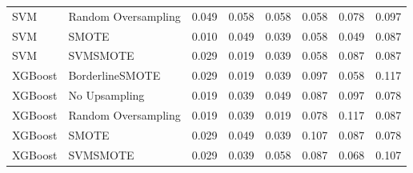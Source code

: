 \begin{tabular}{llllllll}
                         SVM & Random Oversampling & 0.049 &                     0.058 &                 0.058 &                  0.058 &                                   0.078 &    0.097 \\
                         SVM &               SMOTE & 0.010 &                     0.049 &                 0.039 &                  0.058 &                                   0.049 &    0.087 \\
                         SVM &            SVMSMOTE & 0.029 &                     0.019 &                 0.039 &                  0.058 &                                   0.087 &    0.087 \\
                     XGBoost &     BorderlineSMOTE & 0.029 &                     0.019 &                 0.039 &                  0.097 &                                   0.058 &    0.117 \\
                     XGBoost &       No Upsampling & 0.019 &                     0.039 &                 0.049 &                  0.087 &                                   0.097 &    0.078 \\
                     XGBoost & Random Oversampling & 0.019 &                     0.039 &                 0.019 &                  0.078 &                                   0.117 &    0.087 \\
                     XGBoost &               SMOTE & 0.029 &                     0.049 &                 0.039 &                  0.107 &                                   0.087 &    0.078 \\
                     XGBoost &            SVMSMOTE & 0.029 &                     0.039 &                 0.058 &                  0.087 &                                   0.068 &    0.107 \\
\bottomrule
\end{tabular}
